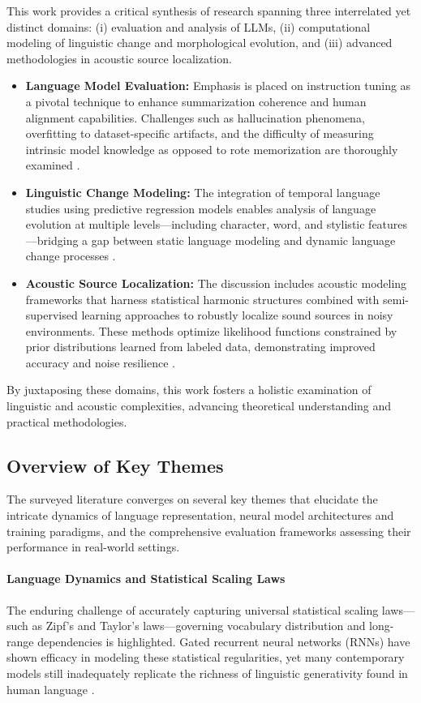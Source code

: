 \documentclass[sigconf]{acmart}
\begin{document}
This work provides a critical synthesis of research spanning three interrelated yet distinct domains: (i) evaluation and analysis of LLMs, (ii) computational modeling of linguistic change and morphological evolution, and (iii) advanced methodologies in acoustic source localization.

\begin{itemize}
    \item \textbf{Language Model Evaluation:} Emphasis is placed on instruction tuning as a pivotal technique to enhance summarization coherence and human alignment capabilities. Challenges such as hallucination phenomena, overfitting to dataset-specific artifacts, and the difficulty of measuring intrinsic model knowledge as opposed to rote memorization are thoroughly examined \cite{ref10,ref51,ref52}.
    \item \textbf{Linguistic Change Modeling:} The integration of temporal language studies using predictive regression models enables analysis of language evolution at multiple levels---including character, word, and stylistic features---bridging a gap between static language modeling and dynamic language change processes \cite{ref41}.
    \item \textbf{Acoustic Source Localization:} The discussion includes acoustic modeling frameworks that harness statistical harmonic structures combined with semi-supervised learning approaches to robustly localize sound sources in noisy environments. These methods optimize likelihood functions constrained by prior distributions learned from labeled data, demonstrating improved accuracy and noise resilience \cite{ref1,ref2,ref3,ref26,ref51}.
\end{itemize}

By juxtaposing these domains, this work fosters a holistic examination of linguistic and acoustic complexities, advancing theoretical understanding and practical methodologies.

\subsection{Overview of Key Themes}

The surveyed literature converges on several key themes that elucidate the intricate dynamics of language representation, neural model architectures and training paradigms, and the comprehensive evaluation frameworks assessing their performance in real-world settings.

\paragraph{Language Dynamics and Statistical Scaling Laws}  
The enduring challenge of accurately capturing universal statistical scaling laws—such as Zipf’s and Taylor’s laws—governing vocabulary distribution and long-range dependencies is highlighted. Gated recurrent neural networks (RNNs) have shown efficacy in modeling these statistical regularities, yet many contemporary models still inadequately replicate the richness of linguistic generativity found in human language \cite{ref51}.
\end{document}
